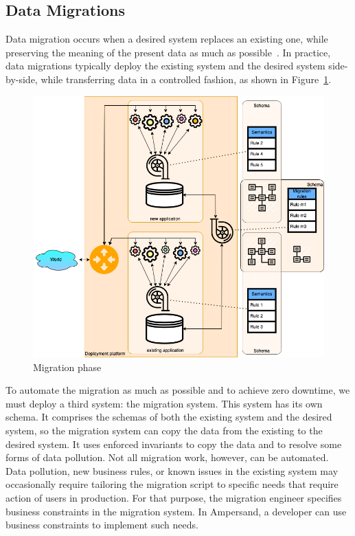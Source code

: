\documentclass[runningheads]{llncs}
\begin{document}
\subsection{Data Migrations}
   Data migration occurs when a desired system replaces an existing one,
   while preserving the meaning of the present data as much as possible~\cite{Spivak2012}.
   In practice, data migrations typically deploy the existing system and the desired system side-by-side,
   while transferring data in a controlled fashion, as shown in Figure~\ref{fig:migration phase}.
\begin{figure}[bht]
   \begin{center}
     \includegraphics[scale=.35]{figures/datamigration-Migration-phase.png}
   \end{center}
\caption{Migration phase}
\label{fig:migration phase}
\end{figure}
   To automate the migration as much as possible and to achieve zero downtime,
   we must deploy a third system: the migration system.
   This system has its own schema.
   It comprises the schemas of both the existing system and the desired system,
   so the migration system can copy the data from the existing to the desired system.
   It uses enforced invariants to copy the data and to resolve some forms of data pollution.
   Not all migration work, however, can be automated.
   Data pollution, new business rules, or known issues in the existing system
   may occasionally require tailoring the migration script to specific needs
   that require action of users in production.
   For that purpose, the migration engineer specifies business constraints in the migration system.
   In Ampersand, a developer can use business constraints to implement such needs.
\end{document}
